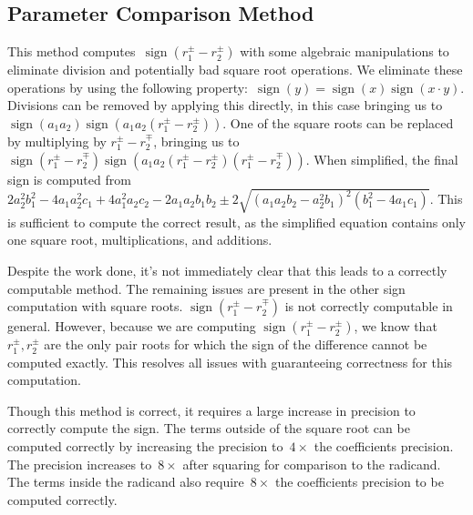 \documentclass{cccg16}
\DeclareMathOperator{\sign}{sign}
\begin{document}
\subsection{Parameter Comparison Method}
This method computes~$\sign(r_1^\pm-r_2^\pm)$ with some algebraic
manipulations to eliminate division and potentially bad square root
operations.  We eliminate these operations by using the following
property:~$\sign(y)=\sign(x)\sign(x\cdot y)$.  Divisions can be
removed by applying this directly, in this case bringing us
to~$\sign(a_1 a_2)\sign(a_1 a_2 (r_1^\pm-r_2^\pm))$.  One of the
square roots can be replaced by multiplying by $r_1^\pm-r_2^\mp$,
bringing us to~$\sign(r_1^\pm-r_2^\mp)\sign(a_1 a_2 (r_1^\pm -
r_2^\pm) (r_1^\pm - r_2^\mp))$.  When simplified, the final sign is
computed from~$2a_2^2b_1^2-4a_1a_2^2c_1+4a_1^2a_2c_2-2a_1a_2b_1b_2\pm
2 \sqrt{(a_1a_2b_2-a_2^2b_1)^2(b_1^2-4a_1c_1)}$. This is sufficient to
compute the correct result, as the simplified equation contains only
one square root, multiplications, and additions.

Despite the work done, it's not immediately clear that this leads to a
correctly computable method.  The remaining issues are present in the
other sign computation with square roots. $\sign(r_1^\pm-r_2^\mp)$ is
not correctly computable in general.  However, because we are
computing $\sign(r_1^\pm-r_2^\pm)$, we know that $r_1^\pm, r_2^\pm$
are the only pair roots for which the sign of the difference cannot be
computed exactly.  This resolves all issues with guaranteeing
correctness for this computation.

Though this method is correct, it requires a large increase in
precision to correctly compute the sign. The terms outside of the
square root can be computed correctly by increasing the precision
to~$4\times$ the coefficients precision.  The precision increases
to~$8\times$ after squaring for comparison to the radicand.  The terms
inside the radicand also require~$8\times$ the coefficients precision
to be computed correctly.
\end{document}
